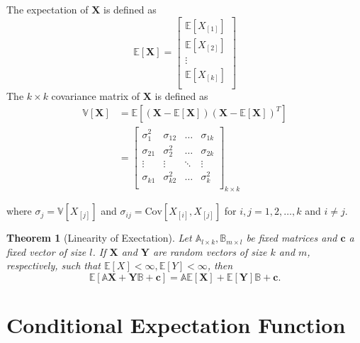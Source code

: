 \documentclass[
]{book}
\newtheorem{theorem}{Theorem}[chapter]
\theoremstyle{definition}
\theoremstyle{definition}
\theoremstyle{definition}
\theoremstyle{definition}
\theoremstyle{remark}
\begin{document}
The expectation of \({\boldsymbol{X}}\) is defined as
\[
{\mathbb{E}}[{\boldsymbol{X}}]=
\begin{bmatrix}
{\mathbb{E}\left[ X_{[1]} \right]} \\
{\mathbb{E}\left[ X_{[2]} \right]} \\
\vdots \\
{\mathbb{E}\left[ X_{[k]} \right]} \\
\end{bmatrix}
\]
The \(k\times k\) covariance matrix of \({\boldsymbol{X}}\) is defined as
\[
\begin{aligned}
{\mathbb{V}\left[ {\boldsymbol{X}} \right]} &={\mathbb{E}\left[ ({\boldsymbol{X}}-{\mathbb{E}\left[ {\boldsymbol{X}} \right]})({\boldsymbol{X}}-{\mathbb{E}\left[ {\boldsymbol{X}} \right]})^T \right]} \\
&=\begin{bmatrix}
\sigma_1^2 & \sigma_{12} & \ldots & \sigma_{1k} \\
\sigma_{21} & \sigma_{2}^2 & \ldots & \sigma_{2k} \\
\vdots & \vdots & \ddots & \vdots \\
\sigma_{k1} & \sigma_{k2}^2 & \ldots & \sigma_{k}^2 \\
\end{bmatrix}_{k\times k}
\end{aligned}
\]

where \(\sigma_j={\mathbb{V}\left[ X_{[j]} \right]}\) and \(\sigma_{ij}={\text{Cov}\left[ X_{[i]},X_{[j]} \right]}\) for \(i,j=1,2,\ldots,k\) and \(i\neq j\).

\begin{theorem}[Linearity of Exectation]
\protect\hypertarget{thm:explin}{}\label{thm:explin}Let \({\mathbb{A}}_{l\times k},{\mathbb{B}}_{m\times l}\) be fixed matrices and \({\boldsymbol{c}}\) a fixed vector of size \(l\). If \({\boldsymbol{X}}\) and \({\boldsymbol{Y}}\) are random vectors of size \(k\) and \(m\), respectively, such that \({\mathbb{E}\left[ X \right]}<\infty,{\mathbb{E}\left[ Y \right]}<\infty\), then
\[
{\mathbb{E}\left[ {\mathbb{A}}{\boldsymbol{X}}+{\boldsymbol{Y}}{\mathbb{B}}+{\boldsymbol{c}} \right]}={\mathbb{A}}{\mathbb{E}\left[ {\boldsymbol{X}} \right]}+{\mathbb{E}\left[ {\boldsymbol{Y}} \right]}{\mathbb{B}}+{\boldsymbol{c}}.
\]
\end{theorem}

\hypertarget{conditional-expectation-function}{%
\section{Conditional Expectation Function}\label{conditional-expectation-function}}
\end{document}

